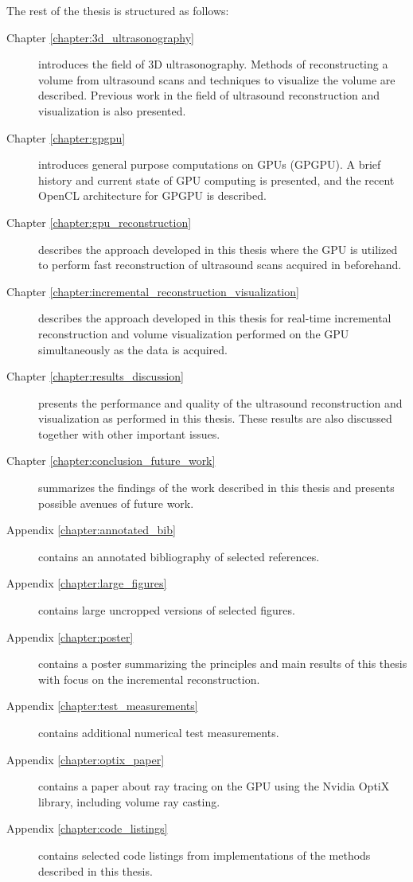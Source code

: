The rest of the thesis is structured as follows:
	
\begin{description}
	\item[Chapter \ref{chapter:3d_ultrasonography}] introduces the field of 3D ultrasonography. Methods of reconstructing a volume from ultrasound scans and techniques to visualize the volume are described. Previous work in the field of ultrasound reconstruction and visualization is also presented.
	\item[Chapter \ref{chapter:gpgpu}] introduces general purpose computations on GPUs (GPGPU). A brief history and current state of GPU computing is presented, and the recent OpenCL architecture for GPGPU is described.
	\item[Chapter \ref{chapter:gpu_reconstruction}] describes the approach developed in this thesis where the GPU is utilized to perform fast reconstruction of ultrasound scans acquired in beforehand.
	\item[Chapter \ref{chapter:incremental_reconstruction_visualization}] describes the approach developed in this thesis for real-time incremental reconstruction and volume visualization performed on the GPU simultaneously as the data is acquired.
	\item[Chapter \ref{chapter:results_discussion}] presents the performance and quality of the ultrasound reconstruction and visualization as performed in this thesis. These results are also discussed together with other important issues.
	\item[Chapter \ref{chapter:conclusion_future_work}] summarizes the findings of the work described in this thesis and presents possible avenues of future work.
	\item[Appendix \ref{chapter:annotated_bib}] contains an annotated bibliography of selected references.
	\item[Appendix \ref{chapter:large_figures}] contains large uncropped versions of selected figures.
	\item[Appendix \ref{chapter:poster}] contains a poster summarizing the principles and main results of this thesis with focus on the incremental reconstruction.
	\item[Appendix \ref{chapter:test_measurements}] contains additional numerical test measurements.
	\item[Appendix \ref{chapter:optix_paper}] contains a paper about ray tracing on the GPU using the Nvidia OptiX library, including volume ray casting.
	\item[Appendix \ref{chapter:code_listings}] contains selected code listings from implementations of the methods described in this thesis.
	
\end{description}